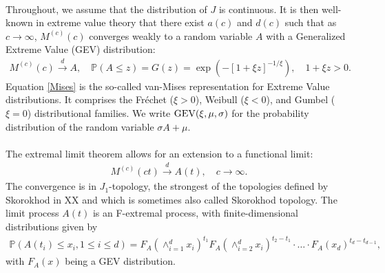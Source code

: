 \documentclass[12pt, a4paper]{article}
\newcommand{\PP}{\mathbb{P}}
\newcommand{\1}{\mathbf 1}
\begin{document}
\paragraph{}
Throughout, we assume that the distribution of $J$ is continuous. 
It is then well-known in extreme value theory that there exist $a(c)$ and $d(c)$
such that as $c \to \infty$,
$M^{(c)}(c)$ converges weakly to a random variable $A$ with a
Generalized Extreme Value (GEV) distribution: 
\begin{align}
M^{(c)}(c) \stackrel{d}{\to} A,
\quad \PP(A \le z) = G(z) = \exp\left(-[1+\xi z]^{-1/\xi}\right), 
\quad 1 + \xi z > 0. \label{Mises}
\end{align}
Equation \eqref{Mises} is the so-called van-Mises representation for 
Extreme Value distributions. 
It comprises the Fr\'echet ($\xi>0$), Weibull ($\xi<0$),
and Gumbel ($\xi = 0$) distributional families. 
We write ${\rm GEV}(\xi, \mu, \sigma)$ for the probability 
distribution of the random variable $\sigma A + \mu$. 

\paragraph{}
The extremal limit theorem allows for an extension to a functional
limit: 
\begin{align*}
M^{(c)}(ct)
\stackrel{d}{\to} A(t),
\quad c \to \infty.
\end{align*}
The convergence is in $J_1$-topology, the strongest of the topologies defined by Skorokhod in XX and which is sometimes also called Skorokhod topology. The limit process $A(t)$ is an F-extremal process, with finite-dimensional distributions given by
\begin{align*}
\PP(A(t_i)\leq x_i,1\leq i \leq d) = F_A(\wedge_{i=1}^d x_i)^{t_1}  F_A(\wedge_{i=2}^d x_i)^{t_2-t_1} \cdot \ldots \cdot F_A(x_d)^{t_d-t_{d-1}},
\end{align*}
with $F_A(x)$ being a GEV distribution.
\end{document}

